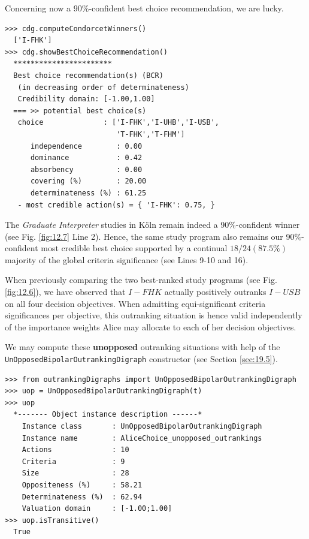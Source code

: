 Concerning now a 90\%-confident best choice recommendation, we are lucky. 

\begin{lstlisting}[caption={Computing the 90\% confident best choice recommendation},label=list:12.7]
>>> cdg.computeCondorcetWinners()
  ['I-FHK']
>>> cdg.showBestChoiceRecommendation()
  ***********************
  Best choice recommendation(s) (BCR)
   (in decreasing order of determinateness)   
   Credibility domain: [-1.00,1.00]
  === >> potential best choice(s)
   choice              : ['I-FHK','I-UHB','I-USB',
                          'T-FHK','T-FHM']
      independence        : 0.00
      dominance           : 0.42
      absorbency          : 0.00
      covering (%)        : 20.00
      determinateness (%) : 61.25
   - most credible action(s) = { 'I-FHK': 0.75, }
\end{lstlisting}
 
The \emph{Graduate Interpreter} studies in Köln remain indeed a 90\%-confident \Condorcet winner (see Fig. \ref{fig:12.7} Line 2). Hence, the same study program also remains our 90\%-confident most credible best choice supported by a continual $18/24 (87.5\%)$ majority of the global criteria significance (see Lines 9-10 and 16).

When previously comparing the two best-ranked study programs (see Fig. \ref{fig:12.6}), we have observed that $I-FHK$ actually positively outranks $I-USB$ on all four decision objectives. When admitting equi-significant criteria significances per objective, this outranking situation is hence valid independently of the importance weights Alice may allocate to each of her decision objectives. 

We may compute these \textbf{unopposed} outranking situations with help of the \texttt{UnOpposedBipolarOutrankingDigraph} constructor (see Section \ref{sec:19.5}).

\begin{lstlisting}[caption={Computing the unopposed outranking situations},label=list:12.8]
>>> from outrankingDigraphs import UnOpposedBipolarOutrankingDigraph
>>> uop = UnOpposedBipolarOutrankingDigraph(t)
>>> uop
  *------- Object instance description ------*
    Instance class       : UnOpposedBipolarOutrankingDigraph
    Instance name        : AliceChoice_unopposed_outrankings
    Actions              : 10
    Criteria             : 9
    Size                 : 28
    Oppositeness (%)     : 58.21
    Determinateness (%)  : 62.94
    Valuation domain     : [-1.00;1.00]
>>> uop.isTransitive()
  True
\end{lstlisting}

